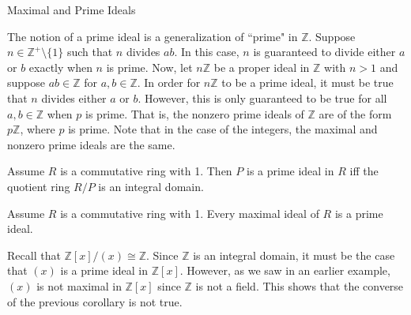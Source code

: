 \begin{section}{Maximal and Prime Ideals}
\begin{remark}
The notion of a prime ideal is a generalization of ``prime" in $\mathbb{Z}$. Suppose $n\in\mathbb{Z}^+\setminus\{1\}$ such that $n$ divides $ab$.  In this case, $n$ is guaranteed to divide either $a$ or $b$ exactly when $n$ is prime.  Now, let $n\mathbb{Z}$ be a proper ideal in $\mathbb{Z}$ with $n>1$ and suppose $ab\in \mathbb{Z}$ for $a,b\in\mathbb{Z}$. In order for $n\mathbb{Z}$ to be a prime ideal, it must be true that $n$ divides either $a$ or $b$.  However, this is only guaranteed to be true for all $a,b\in\mathbb{Z}$ when $p$ is prime.  That is, the nonzero prime ideals of $\mathbb{Z}$ are of the form $p\mathbb{Z}$, where $p$ is prime.  Note that in the case of the integers, the maximal and nonzero prime ideals are the same.
\end{remark}

\begin{theorem}
Assume $R$ is a commutative ring with 1.  Then $P$ is a prime ideal in $R$ iff the quotient ring $R/P$ is an integral domain.
\end{theorem}

\begin{corollary}
Assume $R$ is a commutative ring with 1.  Every maximal ideal of $R$ is a prime ideal.
\end{corollary}

\begin{example}
Recall that $\mathbb{Z}[x]/(x)\cong\mathbb{Z}$.  Since $\mathbb{Z}$ is an integral domain, it must be the case that $(x)$ is a prime ideal in $\mathbb{Z}[x]$.  However, as we saw in an earlier example, $(x)$ is not maximal in $\mathbb{Z}[x]$ since $\mathbb{Z}$ is not a field.  This shows that the converse of the previous corollary is not true.
\end{example}

\end{section}